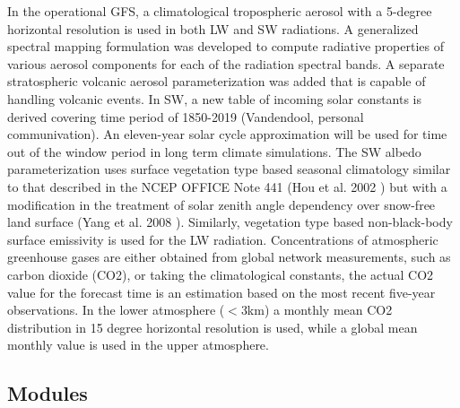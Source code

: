 In the operational G\+FS, a climatological tropospheric aerosol with a 5-\/degree horizontal resolution is used in both LW and SW radiations. A generalized spectral mapping formulation was developed to compute radiative properties of various aerosol components for each of the radiation spectral bands. A separate stratospheric volcanic aerosol parameterization was added that is capable of handling volcanic events. In SW, a new table of incoming solar constants is derived covering time period of 1850-\/2019 (Vandendool, personal communivation). An eleven-\/year solar cycle approximation will be used for time out of the window period in long term climate simulations. The SW albedo parameterization uses surface vegetation type based seasonal climatology similar to that described in the N\+C\+EP O\+F\+F\+I\+CE Note 441 (Hou et al. 2002 \cite{hou_et_al_2002}) but with a modification in the treatment of solar zenith angle dependency over snow-\/free land surface (Yang et al. 2008 \cite{yang_et_al_2008}). Similarly, vegetation type based non-\/black-\/body surface emissivity is used for the LW radiation. Concentrations of atmospheric greenhouse gases are either obtained from global network measurements, such as carbon dioxide (C\+O2), or taking the climatological constants, the actual C\+O2 value for the forecast time is an estimation based on the most recent five-\/year observations. In the lower atmosphere ($<$3km) a monthly mean C\+O2 distribution in 15 degree horizontal resolution is used, while a global mean monthly value is used in the upper atmosphere. \subsection*{Modules}
